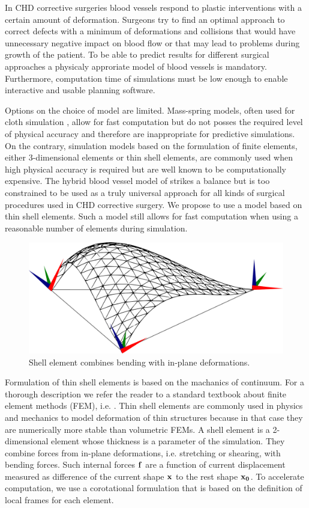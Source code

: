 In CHD corrective surgeries blood vessels respond to plastic interventions with a certain amount of deformation. Surgeons try to find an optimal approach to correct defects with a minimum of deformations and collisions that would have unnecessary negative impact on blood flow or that may lead to problems during growth of the patient. To be able to predict results for different surgical approaches a physicaly approriate model of blood vessels is mandatory. Furthermore, computation time of simulations must be low enough to enable interactive and usable planning software.

Options on the choice of model are limited. Mass-spring models, often used for cloth simulation \cite{Volino2005b}, allow for fast computation but do not posses the required level of physical accuracy and therefore are inappropriate for predictive simulations. On the contrary, simulation models based on the formulation of finite elements, either 3-dimensional elements or thin shell elements, are commonly used when high physical accuracy is required but are well known to be computationally expensive. The hybrid blood vessel model of \cite{Li2009} strikes a balance but is too constrained to be used as a truly universal approach for all kinds of surgical procedures used in CHD corrective surgery. We propose to use a model based on thin shell elements. Such a model still allows for fast computation when using a reasonable number of elements during simulation.

\begin{figure}[tbh]
  \centering
  \includegraphics[width=0.4\columnwidth]{img/shell.pdf}
  \caption{Shell element combines bending with in-plane deformations.}
  \label{fig-shell}
\end{figure}

Formulation of thin shell elements is based on the machanics of continuum. For a thorough description we refer the reader to a standard textbook about finite element methods (FEM), i.e. \cite{Reddy1993}. Thin shell elements are commonly used in physics and mechanics to model deformation of thin structures because in that case they are numerically more stable than volumetric FEMs. A shell element is a 2-dimensional element whose thickness is a parameter of the simulation. They combine forces from in-plane deformations, i.e. stretching or shearing, with bending forces. Such internal forces $\mathbf{f}$ are a function of current displacement measured as difference of the current shape $\mathbf{x}$ to the rest shape $\mathbf{x_0}$. To accelerate computation, we use a corotational formulation that is based on the definition of local frames for each element.

